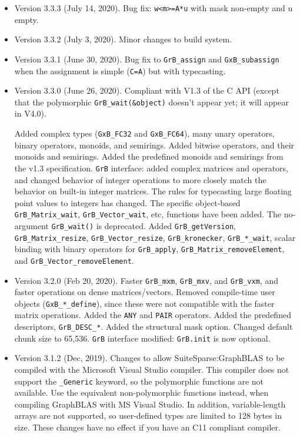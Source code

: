 \begin{itemize}
\item Version 3.3.3 (July 14, 2020).
    Bug fix: \verb'w<m>=A*u' with mask non-empty and u empty.

\item Version 3.3.2 (July 3, 2020).  Minor changes to build system.

\item Version 3.3.1 (June 30, 2020).  Bug fix to \verb'GrB_assign' and
    \verb'GxB_subassign' when the assignment is simple (\verb'C=A') but
    with typecasting.

\item Version 3.3.0 (June 26, 2020).  Compliant with V1.3 of the C API
    (except that the polymorphic \verb'GrB_wait(&object)' doesn't appear yet;
    it will appear in V4.0).

    Added complex types (\verb'GxB_FC32' and \verb'GxB_FC64'), many unary
    operators, binary operators, monoids, and semirings.  Added bitwise
    operators, and their monoids and semirings.  Added the predefined monoids
    and semirings from the v1.3 specification.  \verb'GrB' interface: added complex
    matrices and operators, and changed behavior of integer operations to more
    closely match the behavior on built-in integer matrices.  The rules for
    typecasting large floating point values to integers has changed.  The
    specific object-based \verb'GrB_Matrix_wait', \verb'GrB_Vector_wait', etc,
    functions have been added.  The no-argument \verb'GrB_wait()' is
    deprecated.  Added \verb'GrB_getVersion', \verb'GrB_Matrix_resize',
    \verb'GrB_Vector_resize', \verb'GrB_kronecker', \verb'GrB_*_wait', scalar
    binding with binary operators for \verb'GrB_apply', \newline
    \verb'GrB_Matrix_removeElement', and \verb'GrB_Vector_removeElement'.

\item Version 3.2.0 (Feb 20, 2020).  Faster \verb'GrB_mxm', \verb'GrB_mxv', and
    \verb'GrB_vxm', and faster operations on dense matrices/vectors.  Removed
    compile-time user objects (\verb'GxB_*_define'), since these were not
    compatible with the faster matrix operations.  Added the \verb'ANY' and
    \verb'PAIR' operators.  Added the predefined descriptors,
    \verb'GrB_DESC_*'.  Added the structural mask option.  Changed default
    chunk size to 65,536.  \verb'GrB' interface modified:  \verb'GrB.init' is
    now optional.

\item Version 3.1.2 (Dec, 2019).  Changes to allow SuiteSparse:GraphBLAS
    to be compiled with the Microsoft Visual Studio compiler.  This compiler
    does not support the \verb'_Generic' keyword, so the polymorphic functions
    are not available.  Use the equivalent non-polymorphic functions instead,
    when compiling GraphBLAS with MS Visual Studio.  In addition,
    variable-length arrays are not supported, so user-defined types are limited
    to 128 bytes in size.  These changes have no effect if you have an C11
    compliant compiler.


\end{itemize}
